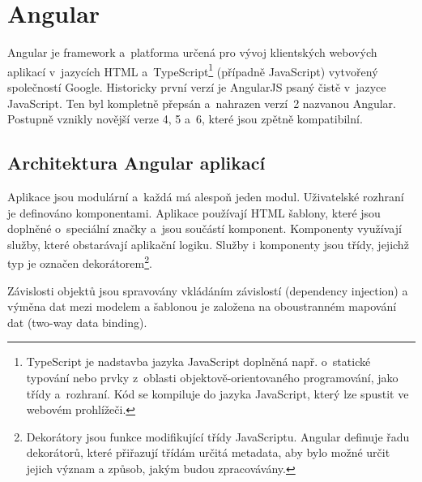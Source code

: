\documentclass[
  digital, %
  oneside, %
  table,   %
  nolof,     %
  nolot,     %
]{fithesis3}
\begin{document}
\section{Angular}
Angular je framework a~platforma určená pro vývoj klientských webových aplikací v~jazycích HTML a~TypeScript\footnote{TypeScript je nadstavba jazyka JavaScript doplněná např. o~statické typování nebo prvky z~oblasti objektově-orientovaného programování, jako třídy a~rozhraní. Kód se kompiluje do jazyka JavaScript, který lze spustit ve webovém prohlížeči.} (případně JavaScript) vytvořený společností Google. Historicky první verzí je AngularJS psaný čistě v~jazyce JavaScript. Ten byl kompletně přepsán a~nahrazen verzí~2 nazvanou Angular. Postupně vznikly novější verze 4, 5 a~6, které jsou zpětně kompatibilní.\par

\subsection{Architektura Angular aplikací}
Aplikace jsou modulární a~každá má alespoň jeden modul. Uživatelské rozhraní je definováno komponentami. Aplikace používají HTML šablony, které jsou doplněné o~speciální značky a~jsou součástí komponent. Komponenty využívají služby, které obstarávají aplikační logiku. Služby i komponenty jsou třídy, jejichž typ je označen dekorátorem\footnote{Dekorátory jsou funkce modifikující třídy JavaScriptu. Angular definuje řadu dekorátorů, které přiřazují třídám určitá metadata, aby bylo možné určit jejich význam a způsob, jakým budou zpracovávány.}.\par
Závislosti objektů jsou spravovány vkládáním závislostí (dependency injection) a výměna dat mezi modelem a šablonou je založena na oboustranném mapování dat (two-way data binding). \cite{angulario}
\end{document}
